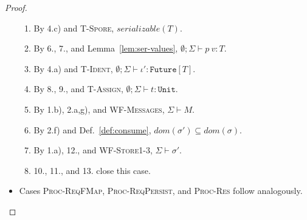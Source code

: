 \begin{proof}
\begin{itemize}
\begin{enumerate}
\item By 4.c) and \textsc{T-Spore}, $serializable(T)$.
\item By 6., 7., and Lemma~\ref{lem:ser-values}, $\emptyset ; \Sigma \vdash p~v : T$.
\item By 4.a) and \textsc{T-Ident}, $\emptyset ; \Sigma \vdash \iota' : \texttt{Future}[T]$.
\item By 8., 9., and \textsc{T-Assign}, $\emptyset ; \Sigma \vdash t : \texttt{Unit}$.
\item By 1.b), 2.a,g), and \textsc{WF-Messages}, $\Sigma \vdash M$.
\item By 2.f) and Def.~\ref{def:consume}, $dom(\sigma') \subseteq dom(\sigma)$.
\item By 1.a), 12., and \textsc{WF-Store1-3}, $\Sigma \vdash \sigma'$.
\item 10., 11., and 13. close this case.
\end{enumerate}

\item Cases \textsc{Proc-ReqFMap}, \textsc{Proc-ReqPersist}, and \textsc{Proc-Res} follow analogously.

\end{itemize}
\end{proof}


